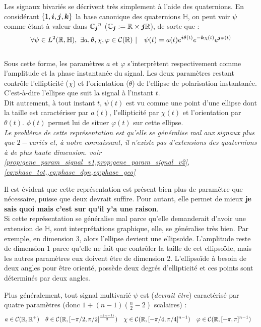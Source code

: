 \begin{proposition}\label{prop:quatern}
Les signaux bivariés se décrivent très simplement à l'aide des quaternions. En considérant $\{1, \bf{i},\bf{j},\bf{k}\}$ la base canonique des quaternions $\mathbb{H}$, on peut voir $\psi$ comme étant à valeur dans ${\C_{\bf{j}}}^n$ ($\C_{\bf{j}} :=\R\times \bf{j}\R$), de sorte que :
\[\forall \psi\in L^2(\R,\mathbb{H}),\ \exists a,\theta,\chi,\varphi \in\mathcal{C}(\R)\ |\quad \psi(t) = a(t)e^{\bf{i}\theta(t)}e^{-\bf{k}\chi(t)}e^{\bf{j}\varphi(t)}\]
\\
Sous cette forme, les paramètres $a$ et $\varphi$ s'interprètent respectivement comme l'amplitude et la phase instantanée du signal. Les deux paramètres restant contrôle l'ellipticité ($\chi$) et l'orientation ($\theta$) de l’ellipse de polarisation instantanée. C'est-à-dire l'ellipse que suit la signal à l'instant $t$.
\\
Dit autrement, à tout instant $t$, $\psi(t)$ est vu comme une point d'une ellipse dont la taille est caractériser par $a(t)$, l'ellipticité par $\chi(t)$ et l'orientation par $\theta(t)$. $\phi(t)$ permet lui de situer $\varphi(t)$ sur cette ellipse.
\\

\textit{Le problème de cette représentation est qu'elle se généralise mal aux signaux plus que $2-$variés et, à notre connaissant, il n'existe pas d'extensions des quaternions à de plus haute dimension. voir \cref{prop:gene_param_signal_v1,prop:gene_param_signal_v2}, \cref{eq:phase_tot,,eq:phase_dyn,eq:phase_geo}} 
\end{proposition}

Il est évident que cette représentation est présent bien plus de paramètre que nécessaire, puisse que deux devrait suffire. Pour autant, elle permet de mieux \textbf{je sais quoi mais c'est sur qu'il y'a une raison}.
\\
Si cette représentation se généralise mal parce qu'elle demanderait d'avoir une extension de $\mathbb{H}$, sont interprétations graphique, elle, se généralise très bien. Par exemple, en dimension 3, alors l'ellipse devient une ellipsoïde. L'amplitude reste de dimension 1 parce qu'elle ne fait que contrôler la taille de cet ellipsoïde, mais les autres paramètres eux doivent être de dimension 2. L'ellipsoïde à besoin de deux angles pour être orienté, possède deux degrés d'ellipticité et ces points sont déterminés par deux angles.


\begin{proposition}\label{prop:gene_param_signal_v1}
Plus généralement, tout signal multivarié $\psi$ est (\textit{devrait être}) caractérisé par quatre paramètres (donc $1+(n-1)(\frac{n}{2}-2)$ scalaires) :
\begin{align*}
	a&\in\mathcal{C}(\R,\R^+)  &  \theta&\in\mathcal{C}(\R, [-\pi/2,\pi/2]^{\frac{n(n-1)}{2}})  &  \chi&\in\mathcal{C}(\R, [-\pi/4,\pi/4]^{n-1})  &  \varphi&\in\mathcal{C}(\R, [-\pi,\pi]^{n-1})
\end{align*}	
\end{proposition}

